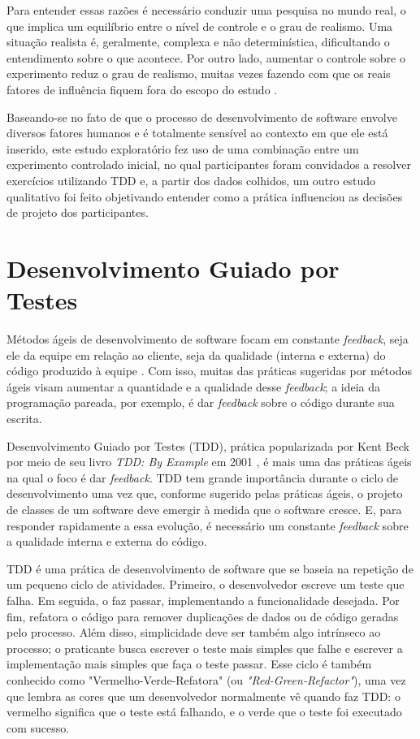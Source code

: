 \documentclass[conference]{IEEEtran}
\begin{document}
Para entender essas razões é necessário
conduzir uma pesquisa no mundo real, o que  
implica um equilíbrio entre o nível de controle
e o grau de realismo. Uma situação realista é, geralmente, complexa e 
não determinística, dificultando o entendimento sobre o que acontece. Por outro
lado, aumentar o controle sobre o experimento reduz o grau de realismo, muitas
vezes fazendo com que os reais fatores de influência fiquem fora do escopo do 
estudo \cite{guidelines-case-study}.

Baseando-se no fato de que o processo de desenvolvimento de software envolve 
diversos fatores humanos e é totalmente sensível ao contexto em que ele está 
inserido, 
este estudo exploratório fez uso de uma combinação entre um experimento controlado inicial, 
no qual participantes foram convidados a resolver exercícios utilizando TDD e, 
a partir dos dados colhidos, um outro estudo qualitativo foi 
feito objetivando entender como a prática influenciou as decisões de projeto 
dos participantes.

\section{Desenvolvimento Guiado por Testes}

Métodos ágeis de desenvolvimento de software focam em constante
\textit{feedback}, seja ele da equipe em relação ao cliente, seja da
qualidade (interna e externa) do código produzido à equipe \cite{AgileManifesto}.
Com isso, muitas das práticas sugeridas por métodos ágeis visam aumentar a 
quantidade e a qualidade desse \textit{feedback}; a ideia da programação pareada, por
exemplo, é dar \textit{feedback} sobre o código durante sua escrita.

Desenvolvimento Guiado por Testes (TDD), prática popularizada por Kent Beck por meio de seu livro
\textit{TDD: By Example} em 2001 \cite{TDDByExample}, é mais uma das práticas
ágeis na qual o foco é dar \textit{feedback}. TDD tem grande importância durante o ciclo
de desenvolvimento uma vez que, conforme sugerido pelas práticas ágeis, o projeto de classes de um
software deve emergir à medida que o software cresce. E, para responder
rapidamente a essa evolução, é necessário um constante \textit{feedback} sobre a
qualidade interna e externa do código.

TDD é uma prática de desenvolvimento de software que se baseia na repetição de
um pequeno ciclo de atividades. Primeiro, o desenvolvedor escreve um
teste que falha. Em seguida, o faz passar, implementando a
funcionalidade desejada. Por fim, refatora o código para remover
duplicações de dados ou de código geradas pelo processo.
Além disso, simplicidade deve ser também algo intrínseco ao processo; o praticante
busca escrever o teste mais simples que falhe e escrever a implementação mais simples
que faça o teste passar.
Esse ciclo
é também conhecido como 
"Vermelho-Verde-Refatora" (ou \textit{"Red-Green-Refactor"}), uma vez que lembra as cores que um 
desenvolvedor normalmente vê quando faz TDD: o vermelho significa que
o teste está falhando, e o verde que o teste foi executado com sucesso.
\end{document}
